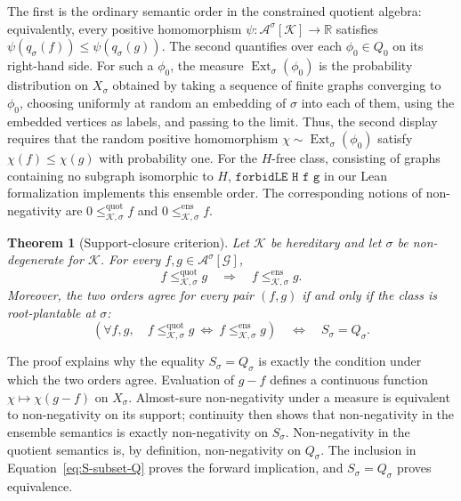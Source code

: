 \documentclass{article}
\newtheorem{theorem}{Theorem}[section]
\newcommand{\R}{\mathbb{R}}
\newcommand{\FlagAlg}[1]{\mathcal{A}^{#1}}
\newcommand{\lean}[1]{\texttt{#1}}
\newcommand{\Ext}{\operatorname{Ext}}
\begin{document}
The first is the ordinary semantic order in the constrained quotient algebra:
equivalently, every positive homomorphism
\(\psi:\FlagAlg{\sigma}[\mathcal K]\to\R\) satisfies
\(\psi(q_\sigma(f))\leq\psi(q_\sigma(g))\).  The second quantifies over each
\(\phi_0\in Q_0\) on its right-hand side.  For such a
\(\phi_0\), the measure \(\Ext_\sigma(\phi_0)\) is the probability distribution
on \(X_\sigma\) obtained by taking a sequence of finite graphs converging
to \(\phi_0\), choosing uniformly at random an embedding of \(\sigma\) into
each of them, using the embedded vertices as labels, and passing to the
limit.  Thus, the second display requires
that the random positive homomorphism \(\chi\sim\Ext_\sigma(\phi_0)\) satisfy
\(\chi(f)\leq\chi(g)\) with probability one.
For the \(H\)-free class, consisting of graphs containing no subgraph
isomorphic to \(H\),
\(\lean{forbidLE H f g}\) in our Lean formalization implements this ensemble order.  The corresponding
notions of non-negativity are \(0\leq^{\mathrm{quot}}_{\mathcal K,\sigma}f\) and
\(0\leq^{\mathrm{ens}}_{\mathcal K,\sigma}f\).

\begin{theorem}[Support-closure criterion]\label{thm:support-closure-summary}
Let \(\mathcal K\) be hereditary and let \(\sigma\) be non-degenerate for
\(\mathcal K\).  For every \(f,g\in\FlagAlg{\sigma}[\mathcal G]\),
\[
  f\leq^{\mathrm{quot}}_{\mathcal K,\sigma}g
  \quad\Longrightarrow\quad
  f\leq^{\mathrm{ens}}_{\mathcal K,\sigma}g.
\]
Moreover, the two orders agree for every pair \((f,g)\) if and only if the class
is root-plantable at \(\sigma\):
\[
  \left(
    \forall f,g,\quad
    f\leq^{\mathrm{quot}}_{\mathcal K,\sigma}g
    \ \Longleftrightarrow\
    f\leq^{\mathrm{ens}}_{\mathcal K,\sigma}g
  \right)
  \quad\Longleftrightarrow\quad
  S_\sigma=Q_\sigma.
\]
\end{theorem}

The proof explains why the equality \(S_\sigma=Q_\sigma\) is exactly the
condition under which the two orders agree.  Evaluation of
\(g-f\) defines a continuous function
\(\chi\mapsto\chi(g-f)\) on \(X_\sigma\).  Almost-sure non-negativity under a
measure is equivalent to non-negativity on its support; continuity then shows
that non-negativity in the ensemble semantics is exactly non-negativity on
\(S_\sigma\).  Non-negativity in the quotient semantics is, by definition,
non-negativity on \(Q_\sigma\).
The inclusion in Equation~\eqref{eq:S-subset-Q} proves the forward implication, and
\(S_\sigma=Q_\sigma\) proves equivalence.
\end{document}
